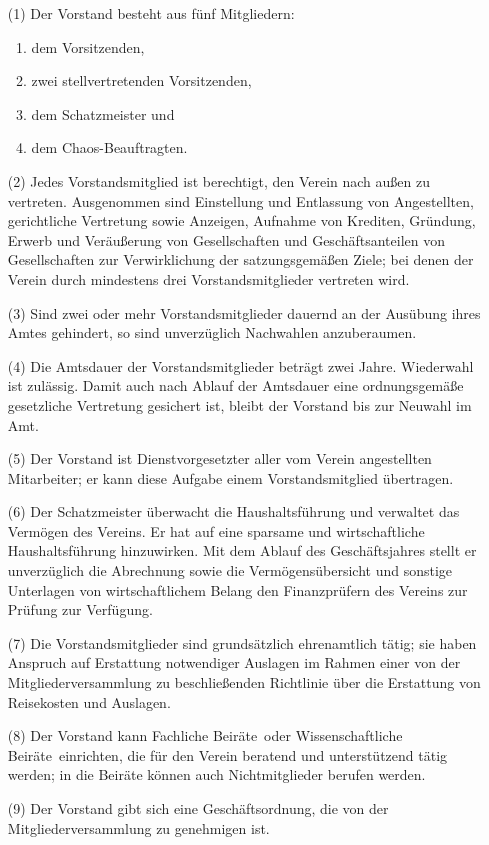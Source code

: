 \documentclass[12pt,paper=a4,ngerman]{scrreprt}
\begin{document}
\begin{itemize}
\item[(1)]
Der Vorstand besteht aus fünf Mitgliedern:
\begin{enumerate}
\item
dem Vorsitzenden,
\item
zwei stellvertretenden Vorsitzenden,
\item
dem Schatzmeister und
\item
dem Chaos-Beauftragten.
\end{enumerate}
\item[(2)]
Jedes Vorstandsmitglied ist berechtigt, den Verein nach außen zu
vertreten. Ausgenommen sind Einstellung und Entlassung von
Angestellten, gerichtliche Vertretung sowie Anzeigen, Aufnahme von
Krediten, Gründung, Erwerb und Veräußerung von Gesellschaften und
Geschäftsanteilen von Gesellschaften zur Verwirklichung der
satzungsgemäßen Ziele; bei denen der Verein durch mindestens drei
Vorstandsmitglieder vertreten wird.
\item[(3)]
Sind zwei oder mehr Vorstandsmitglieder dauernd an der Ausübung ihres
Amtes gehindert, so sind unverzüglich Nachwahlen anzuberaumen.
\item[(4)]
Die Amtsdauer der Vorstandsmitglieder beträgt zwei Jahre. Wiederwahl
ist zulässig. Damit auch nach Ablauf der Amtsdauer eine ordnungsgemäße
gesetzliche Vertretung gesichert ist, bleibt der Vorstand bis zur
Neuwahl im Amt.
\item[(5)]
Der Vorstand ist Dienstvorgesetzter aller vom Verein angestellten
Mitarbeiter; er kann diese Aufgabe einem Vorstandsmitglied
übertragen.
\item[(6)]
Der Schatzmeister überwacht die Haushaltsführung und verwaltet das
Vermögen des Vereins. Er hat auf eine sparsame und wirtschaftliche
Haushaltsführung hinzuwirken. Mit dem Ablauf des Geschäftsjahres
stellt er unverzüglich die Abrechnung sowie die Vermögensübersicht und
sonstige Unterlagen von wirtschaftlichem Belang den Finanzprüfern des
Vereins zur Prüfung zur Verfügung.
\item[(7)]
Die Vorstandsmitglieder sind grundsätzlich ehrenamtlich tätig; sie
haben Anspruch auf Erstattung notwendiger Auslagen im Rahmen einer von
der Mitgliederversammlung zu beschließenden Richtlinie über die
Erstattung von Reisekosten und Auslagen.
\item[(8)]
Der Vorstand kann \glqq Fachliche Beiräte\grqq\ oder \glqq
Wissenschaftliche Beiräte\grqq\ einrichten, die für den Verein
beratend und unterstützend tätig werden; in die Beiräte können auch
Nichtmitglieder berufen werden.
\item[(9)]
Der Vorstand gibt sich eine Geschäftsordnung, die von der
Mitgliederversammlung zu genehmigen ist.
\end{itemize}
\end{document}

